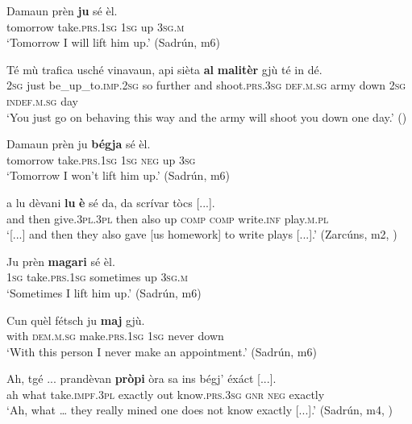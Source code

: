 \ea\label{ex:pv:1}
\gll   Damaun prèn \textbf{ju} sé èl.\\
     tomorrow take.\textsc{prs.1sg} \textsc{1sg} up \textsc{3sg.m}\\
\glt `Tomorrow I will lift him up.' (Sadrún, m6)
\z

\ea\label{ex:pv:2}
\gll  Té mù trafica usché vinavaun, api sièta \textbf{al} \textbf{malitèr} gjù té in dé.\\
     \textsc{2sg} just be\_up\_to.\textsc{imp.2sg} so further and shoot.\textsc{prs.3sg} \textsc{def.m.sg} army down \textsc{2sg} \textsc{indef.m.sg} day\\
\glt `You just go on behaving this way and the army will shoot you down one day.' (\citealt[91]{Gadola1935})
\z

\ea\label{ex:pv:3}
\gll   Damaun prèn ju \textbf{bégja} sé èl.\\
     tomorrow take.\textsc{prs.1sg} \textsc{1sg} \textsc{neg} up \textsc{3sg}\\
\glt `Tomorrow I won’t lift him up.' (Sadrún, m6)
\z

\ea\label{ex:pv:4}
\gll    [...] a lu dèvani \textbf{lu} \textbf{è} sé da, da scrívar tòcs [...].\\
{} and then give.\textsc{3pl.3pl} then also up \textsc{comp} \textsc{comp} write.\textsc{inf} play.\textsc{m.pl}\\
\glt `[...] and then they also gave [us homework] to write plays [...].' (Zarcúns, m2, )
\z

\ea
\label{ex:pv:5}
\gll  Ju prèn \textbf{magari} sé èl.  \\
\textsc{1sg} take.\textsc{prs.1sg} sometimes up \textsc{3sg.m}\\
\glt `Sometimes I lift him up.' (Sadrún, m6)
\z

\ea
\label{ex:pv:6}
\gll  Cun quèl fétsch ju \textbf{maj} gjù.  \\
with \textsc{dem.m.sg} make.\textsc{prs.1sg} \textsc{1sg} never down\\
\glt `With this person I never make an appointment.' (Sadrún, m6)
\z

\ea
\label{ex:pv:7}
\gll   Ah, tgé ... prandèvan \textbf{pròpi} òra sa ins bégj' éxáct [...]. \\
ah what {} take.\textsc{impf.3pl} exactly out know.\textsc{prs.3sg} \textsc{gnr} \textsc{neg} exactly\\
\glt `Ah, what … they really mined one does not know exactly [...].' (Sadrún, m4, )
\z

